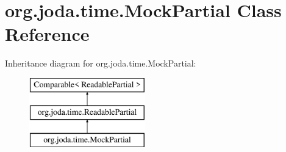 \hypertarget{classorg_1_1joda_1_1time_1_1_mock_partial}{\section{org.\-joda.\-time.\-Mock\-Partial Class Reference}
\label{classorg_1_1joda_1_1time_1_1_mock_partial}
}
Inheritance diagram for org.\-joda.\-time.\-Mock\-Partial\-:\begin{figure}[H]
\begin{center}
\leavevmode
\includegraphics[height=3.000000cm]{classorg_1_1joda_1_1time_1_1_mock_partial}
\end{center}
\end{figure}
